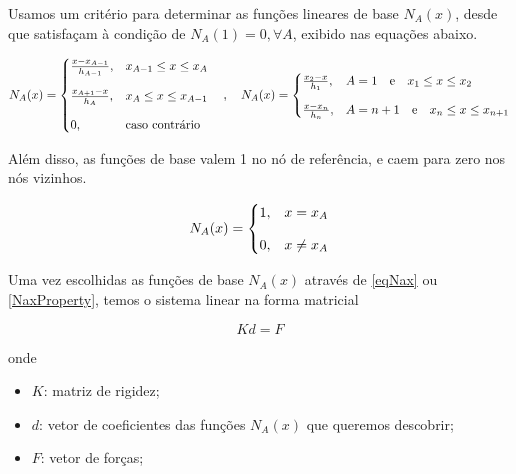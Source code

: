 \documentclass[12pt]{scrartcl}
\begin{document}
Usamos um critério para determinar as funções lineares de base $N_A(x)$, desde que satisfaçam à condição de $N_A(1) = 0, \forall A$,
exibido nas equações abaixo.

\begin{equation}\label{eqNax}
    N_A(x) =
    \begin{cases}
        \frac{x - x_{A-1}}{h_{A-1}}, & x_{A-1} \leq x \leq x_A   \\
        \noalign{\vskip9pt}
        \frac{x_{A+1} - x}{h_{A}},   & x_{A} \leq x \leq x_{A-1} \\
        \noalign{\vskip9pt}
        0,                           & \textrm{caso contrário}
    \end{cases}
    \quad , \quad
    N_A(x) =
    \begin{cases}
        \frac{x_2 - x}{h_1}, & A = 1 \quad \textrm{e} \quad x_{1} \leq x \leq x_2       \\
        \noalign{\vskip9pt}
        \frac{x - x_n}{h_n}, & A = n+1 \quad \textrm{e} \quad x_{n} \leq x \leq x_{n+1}
    \end{cases}
\end{equation}

Além disso, as funções de base valem 1 no nó de referência, e caem para zero nos nós vizinhos.

\begin{equation}\label{NaxProperty}
    N_A(x) = \begin{cases}
        1, & x = x_A    \\
        \noalign{\vskip9pt}
        0, & x \neq x_A \\
    \end{cases}
\end{equation}

Uma vez escolhidas as funções de base $N_A(x)$ através de \eqref{eqNax} ou \eqref{NaxProperty}, temos o sistema linear na forma matricial

\begin{equation}\label{eqkdf}
    Kd = F
\end{equation}

onde

\begin{itemize}
    \item $K$: matriz de rigidez;
    \item $d$: vetor de coeficientes das funções $N_A(x)$ que queremos descobrir;
    \item $F$: vetor de forças;
\end{itemize}
\end{document}
